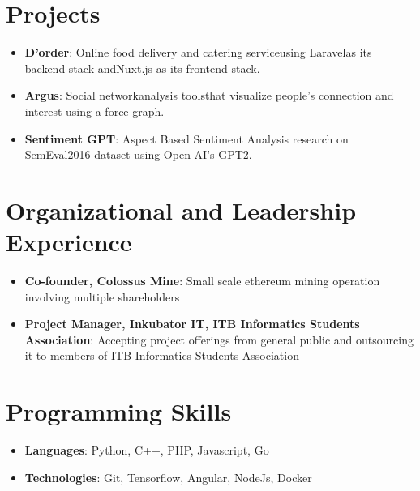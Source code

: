 \documentclass[letterpaper,11pt]{article}
\newcommand{\resumeItem}[2]{
  \item\small{
    \textbf{#1}{: #2 \vspace{-2pt}}
  }
}
\newcommand{\resumeSubItem}[2]{\resumeItem{#1}{#2}\vspace{-4pt}}
\newcommand{\resumeSubHeadingListStart}{\begin{itemize}[leftmargin=*]}
\newcommand{\resumeSubHeadingListEnd}{\end{itemize}}
\begin{document}
\section{Projects}
  \resumeSubHeadingListStart
    \resumeSubItem{D’order}
      {Online food delivery and catering serviceusing Laravelas its backend stack andNuxt.js as its frontend stack.}
    \resumeSubItem{Argus}
      {Social networkanalysis toolsthat visualize people’s connection and interest using a force graph.}
    \resumeSubItem{Sentiment GPT}
      {Aspect Based Sentiment Analysis research on SemEval2016 dataset using Open AI's GPT2.}
  \resumeSubHeadingListEnd 



\section{Organizational and Leadership Experience}
  \resumeSubHeadingListStart
    \resumeSubItem{Co-founder, Colossus Mine}
      {Small scale ethereum mining operation involving multiple shareholders}
    \resumeSubItem{Project Manager, Inkubator IT, ITB Informatics Students Association}
      {Accepting project offerings from general public and outsourcing it to members of ITB Informatics Students Association}
  \resumeSubHeadingListEnd 
  



\section{Programming Skills}
 \resumeSubHeadingListStart
   \item{
      \textbf{Languages}{: Python, C++, PHP, Javascript, Go}      
   }
   \item{
      \textbf{Technologies}{: Git, Tensorflow, Angular, NodeJs, Docker}
   }
 \resumeSubHeadingListEnd


\end{document}
